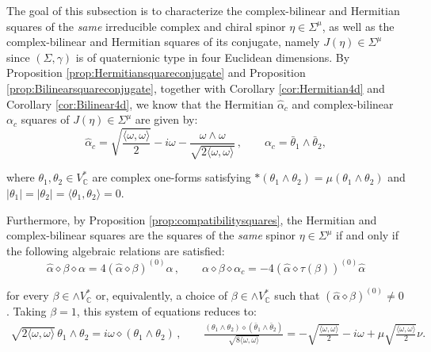 \documentclass[10pt,a4paper,twoside,reqno]{amsart}
\theoremstyle{plain}
\theoremstyle{definition}
\theoremstyle{remark}
\def\C{\mathbb{C}}
\newcommand{\abs}[1]{\left\lvert#1\right\rvert}
\newcommand{\escal}[1]{\langle#1\rangle}
\begin{document}
The goal of this subsection is to characterize the complex-bilinear and Hermitian squares of the \emph{same} irreducible complex and chiral spinor $\eta\in\Sigma^{\mu}$, as well as the complex-bilinear and Hermitian squares of its conjugate, namely $J(\eta)\in\Sigma^{\mu}$ since $(\Sigma,\gamma)$ is of quaternionic type in four Euclidean dimensions. By Proposition \ref{prop:Hermitiansquareconjugate} and Proposition \ref{prop:Bilinearsquareconjugate}, together with Corollary \ref{cor:Hermitian4d} and Corollary \ref{cor:Bilinear4d}, we know that the Hermitian $\widehat{\alpha}_c$ and complex-bilinear $\alpha_c$ squares of $J(\eta) \in \Sigma^{\mu}$ are given by:
\begin{equation*}
\widehat{\alpha}_c =  \sqrt{\frac{ \escal{\omega,\omega}}{2}} - i\omega - \frac{\omega\wedge \omega}{\sqrt{2\escal{\omega,\omega}}}  \, , \qquad \alpha_c = \bar{\theta}_1 \wedge \bar{\theta}_2,
\end{equation*}

\noindent
where $\theta_1 , \theta_2 \in V^{\ast}_{\C}$ are complex one-forms satisfying $\ast (\theta_1\wedge\theta_2) = \mu (\theta_1\wedge\theta_2)$ and $\abs{\theta_1}=\abs{\theta_2}=\escal{\theta_1,\theta_2}=0$.

\noindent
Furthermore, by Proposition \ref{prop:compatibilitysquares}, the Hermitian and complex-bilinear squares are the squares of the \emph{same} spinor $\eta\in \Sigma^{\mu}$ if and only if the following algebraic relations are satisfied: 
\begin{equation*}  
\widehat{\alpha} \diamond \beta \diamond \alpha   = 4 (\widehat{\alpha} \diamond \beta)^{(0)} \alpha \, , \qquad   \alpha \diamond \beta \diamond \alpha_c = -  4    (\widehat{\alpha} \diamond   \tau(\beta))^{(0)} \widehat{\alpha}
\end{equation*} 

\noindent
for every $\beta\in \wedge V^{\ast}_{\C}$ or, equivalently, a choice of $\beta\in \wedge V^{\ast}_{\C}$ such that $(\widehat{\alpha} \diamond \beta)^{(0)}  \neq 0$. Taking $\beta = 1$, this system of equations reduces to:
\begin{eqnarray*}
\sqrt{2\escal{\omega,\omega}}\, \theta_1 \wedge \theta_2 =  i \omega \diamond (\theta_1 \wedge \theta_2)    \, , \qquad  \frac{(\theta_1 \wedge \theta_2) \diamond (\bar{\theta}_1 \wedge \bar{\theta}_2)}{ \sqrt{8 \escal{\omega,\omega}}} = - \sqrt{\frac{ \escal{\omega,\omega}}{2}} - i\omega + \mu \sqrt{\frac{ \escal{\omega,\omega}}{2}} \nu.
\end{eqnarray*}
\end{document}
